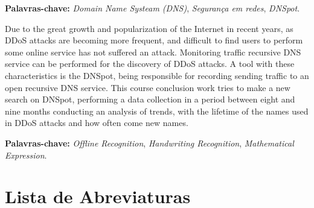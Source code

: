 \noindent \textbf{Palavras-chave:} \textit{Domain Name Systeam (DNS)}, \textit{Segurança em redes}, \textit{DNSpot}.


Due to the great growth and popularization of the Internet in recent years, as DDoS attacks are becoming more frequent, and difficult to find users to perform some online service has not suffered an attack. Monitoring traffic recursive DNS service can be performed for the discovery of DDoS attacks. A tool with these characteristics is the DNSpot, being responsible for recording sending traffic to an open recursive DNS service. This course conclusion work tries to make a new search on DNSpot, performing a data collection in a period between eight and nine months conducting an analysis of trends, with the lifetime of the names used in DDoS attacks and how often come new names.

\noindent \textbf{Palavras-chave:} \textit{Offline Recognition}, \textit{Handwriting Recognition}, \textit{Mathematical Expression}.

\tableofcontents
\listoffigures
\listoftables
\newpage
\chapter*{Lista de Abreviaturas\hfill} 
\listofsymbols

\newpage
\pagestyle{myheadings}
